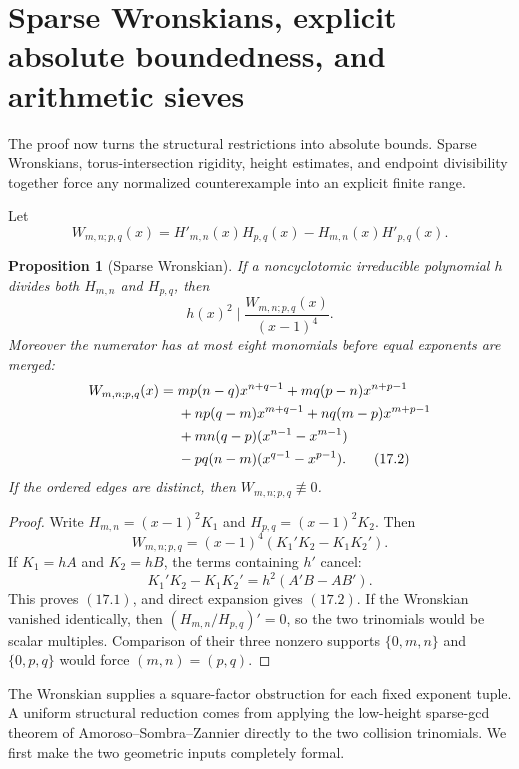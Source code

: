 \documentclass[11pt]{article}
\newtheorem{proposition}[theorem]{Proposition}
\theoremstyle{definition}
\begin{document}
\section{Sparse Wronskians, explicit absolute boundedness, and arithmetic sieves}
\label{sec:wronskian}

The proof now turns the structural restrictions into absolute bounds.  Sparse Wronskians, torus-intersection rigidity, height estimates, and endpoint divisibility together force any normalized counterexample into an explicit finite range.

Let
\[
 W_{m,n;p,q}(x)
 =H'_{m,n}(x)H_{p,q}(x)-H_{m,n}(x)H'_{p,q}(x).
\]

\begin{proposition}[Sparse Wronskian]\label{prop:wronskian}
If a noncyclotomic irreducible polynomial \(h\) divides both
\(H_{m,n}\) and \(H_{p,q}\), then
\begin{equation}
 h(x)^2\mid \frac{W_{m,n;p,q}(x)}{(x-1)^4}.
 \tag{17.1}
\end{equation}
Moreover the numerator has at most eight monomials before equal exponents are
merged:
\begin{align}
 W_{m,n;p,q}(x)={}&mp(n-q)x^{n+q-1}
 +mq(p-n)x^{n+p-1} \notag\\
 &+np(q-m)x^{m+q-1}
 +nq(m-p)x^{m+p-1} \notag\\
 &+mn(q-p)(x^{n-1}-x^{m-1}) \notag\\
 &-pq(n-m)(x^{q-1}-x^{p-1}).
 \tag{17.2}
\end{align}
If the ordered edges are distinct, then \(W_{m,n;p,q}\not\equiv0\).
\end{proposition}

\begin{proof}
Write \(H_{m,n}=(x-1)^2K_1\) and
\(H_{p,q}=(x-1)^2K_2\).  Then
\[
 W_{m,n;p,q}=(x-1)^4(K_1'K_2-K_1K_2').
\]
If \(K_1=hA\) and \(K_2=hB\), the terms containing \(h'\) cancel:
\[
 K_1'K_2-K_1K_2'=h^2(A'B-AB').
\]
This proves \((17.1)\), and direct expansion gives \((17.2)\).
If the Wronskian vanished identically, then
\((H_{m,n}/H_{p,q})'=0\), so the two trinomials would be scalar multiples.
Comparison of their three nonzero supports \(\{0,m,n\}\) and
\(\{0,p,q\}\) would force \((m,n)=(p,q)\).
\end{proof}

The Wronskian supplies a square-factor obstruction for each fixed exponent
tuple.  A uniform structural reduction comes from applying the low-height
sparse-gcd theorem of Amoroso--Sombra--Zannier directly to the two collision
trinomials.  We first make the two geometric inputs completely formal.
\end{document}
